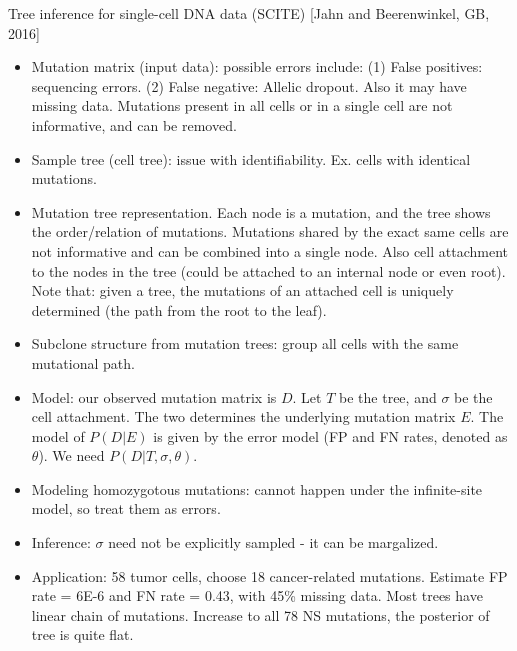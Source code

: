 \documentclass{report}
\begin{document}
Tree inference for single-cell DNA data (SCITE) [Jahn and Beerenwinkel, GB, 2016]
\begin{itemize}
	
	\item Mutation matrix (input data): possible errors include: (1) False positives: sequencing errors. (2) False negative: Allelic dropout. Also it may have missing data. Mutations present in all cells or in a single cell are not informative, and can be removed. 
	
	\item Sample tree (cell tree): issue with identifiability. Ex. cells with identical mutations. 
	
	\item Mutation tree representation. Each node is a mutation, and the tree shows the order/relation of mutations. Mutations shared by the exact same cells are not informative and can be combined into a single node. Also cell attachment to the nodes in the tree (could be attached to an internal node or even root). Note that: given a tree, the mutations of an attached cell is uniquely determined (the path from the root to the leaf). 
	
	\item Subclone structure from mutation trees: group all cells with the same mutational path. 
	
	\item Model: our observed mutation matrix is $D$. Let $T$ be the tree, and $\sigma$ be the cell attachment. The two determines the underlying mutation matrix $E$. The model of $P(D|E)$ is given by the error model (FP and FN rates, denoted as $\theta$). We need $P(D|T, \sigma, \theta)$.
	
	\item Modeling homozygotous mutations: cannot happen under the infinite-site model, so treat them as errors.   
	
	\item Inference: $\sigma$ need not be explicitly sampled - it can be margalized.  
	
	\item Application: 58 tumor cells, choose 18 cancer-related mutations. Estimate FP rate = 6E-6 and FN rate = 0.43, with 45\% missing data.  Most trees have linear chain of mutations. Increase to all 78 NS mutations, the posterior of tree is quite flat. 
\end{itemize}
\end{document}
